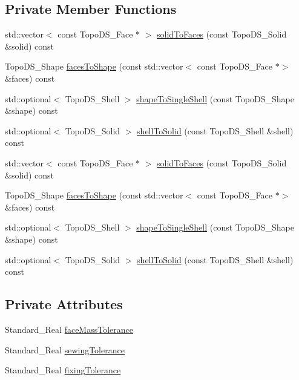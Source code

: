 \subsection*{Private Member Functions}
\begin{DoxyCompactItemize}
\item 
std\+::vector$<$ const Topo\+D\+S\+\_\+\+Face $\ast$ $>$ \hyperlink{classMcCAD_1_1Decomposition_1_1SolidRebuilder_a865c311ae7c34395b9c7911c88af56cb}{solid\+To\+Faces} (const Topo\+D\+S\+\_\+\+Solid \&solid) const
\item 
Topo\+D\+S\+\_\+\+Shape \hyperlink{classMcCAD_1_1Decomposition_1_1SolidRebuilder_a999dae53070de2c6681c51cfc6a56cd5}{faces\+To\+Shape} (const std\+::vector$<$ const Topo\+D\+S\+\_\+\+Face $\ast$$>$ \&faces) const
\item 
std\+::optional$<$ Topo\+D\+S\+\_\+\+Shell $>$ \hyperlink{classMcCAD_1_1Decomposition_1_1SolidRebuilder_abcbb84bed6ab279e3f5ed3342d439f22}{shape\+To\+Single\+Shell} (const Topo\+D\+S\+\_\+\+Shape \&shape) const
\item 
std\+::optional$<$ Topo\+D\+S\+\_\+\+Solid $>$ \hyperlink{classMcCAD_1_1Decomposition_1_1SolidRebuilder_af37e601d9e3fa7309e7a02f95d8faa61}{shell\+To\+Solid} (const Topo\+D\+S\+\_\+\+Shell \&shell) const
\item 
std\+::vector$<$ const Topo\+D\+S\+\_\+\+Face $\ast$ $>$ \hyperlink{classMcCAD_1_1Decomposition_1_1SolidRebuilder_a0d2cb98a29f9e87aedff3c727c5d1f99}{solid\+To\+Faces} (const Topo\+D\+S\+\_\+\+Solid \&solid) const
\item 
Topo\+D\+S\+\_\+\+Shape \hyperlink{classMcCAD_1_1Decomposition_1_1SolidRebuilder_a999dae53070de2c6681c51cfc6a56cd5}{faces\+To\+Shape} (const std\+::vector$<$ const Topo\+D\+S\+\_\+\+Face $\ast$$>$ \&faces) const
\item 
std\+::optional$<$ Topo\+D\+S\+\_\+\+Shell $>$ \hyperlink{classMcCAD_1_1Decomposition_1_1SolidRebuilder_ad85da8e2682f2422a84107b31e9e2681}{shape\+To\+Single\+Shell} (const Topo\+D\+S\+\_\+\+Shape \&shape) const
\item 
std\+::optional$<$ Topo\+D\+S\+\_\+\+Solid $>$ \hyperlink{classMcCAD_1_1Decomposition_1_1SolidRebuilder_aef86b878c356fb7e3ec99a80c67c3ef9}{shell\+To\+Solid} (const Topo\+D\+S\+\_\+\+Shell \&shell) const
\end{DoxyCompactItemize}
\subsection*{Private Attributes}
\begin{DoxyCompactItemize}
\item 
Standard\+\_\+\+Real \hyperlink{classMcCAD_1_1Decomposition_1_1SolidRebuilder_a7f2b562442c029dfec153a3f16df5b79}{face\+Mass\+Tolerance}
\item 
Standard\+\_\+\+Real \hyperlink{classMcCAD_1_1Decomposition_1_1SolidRebuilder_a976ffb9b0eef03a646ba42eda6abaeb6}{sewing\+Tolerance}
\item 
Standard\+\_\+\+Real \hyperlink{classMcCAD_1_1Decomposition_1_1SolidRebuilder_a0daee0f1322cd101aa0f404a8aae0419}{fixing\+Tolerance}
\end{DoxyCompactItemize}


